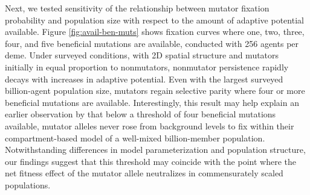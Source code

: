 Next, we tested sensitivity of the relationship between mutator fixation probability and population size with respect to the amount of adaptive potential available.
Figure \ref{fig:avail-ben-muts} shows fixation curves where one, two, three, four, and five beneficial mutations are available, conducted with 256 agents per deme.
Under surveyed conditions, with 2D spatial structure and mutators initially in equal proportion to nonmutators, nonmutator persistence rapidly decays with increases in adaptive potential.
Even with the largest surveyed billion-agent population size, mutators regain selective parity where four or more beneficial mutations are available.
Interestingly, this result may help explain an earlier observation by \citet{tenaillon1999mutators} that below a threshold of four beneficial mutations available, mutator alleles never rose from background levels to fix within their compartment-based model of a well-mixed billion-member population.
Notwithstanding differences in model parameterization and population structure, our findings suggest that this threshold may coincide with the point where the net fitness effect of the mutator allele neutralizes in commensurately scaled populations.

% 




